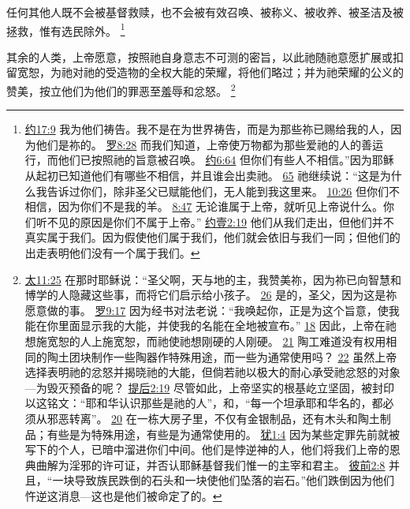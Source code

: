 \documentclass[12pt, a4paper, oneside]{ctexart}
\newcounter{parnum}[section]
\newcommand{\N}{%
   \noindent\refstepcounter{parnum}%
    \makebox[\parindent][l]{\textbf{\arabic{parnum}.}}}
\begin{document}
	任何其他人既不会被基督救赎，也不会被有效召唤、被称义、被收养、被圣洁及被拯救，惟有选民除外。
	\footnote {
		\href{https://biblehub.com/john/17-9.htm}{约17:9} 我为他们祷告。我不是在为世界祷告，而是为那些祢已赐给我的人，因为他们是祢的。
		\href{https://biblehub.com/romans/8-28.htm}{罗8:28} 而我们知道，上帝使万物都为那些爱祂的人的善运行，而他们已按照祂的旨意被召唤。
		\href{https://biblehub.com/john/6-64.htm}{约6:64} 但你们有些人不相信。”因为耶稣从起初已知道他们有哪些不相信，并且谁会出卖祂。
		\href{https://biblehub.com/john/6-65.htm}{65} 祂继续说：“这是为什么我告诉过你们，除非圣父已赋能他们，无人能到我这里来。
		\href{https://biblehub.com/john/10-26.htm}{10:26} 但你们不相信，因为你们不是我的羊。
		\href{https://biblehub.com/john/8-47.htm}{8:47} 无论谁属于上帝，就听见上帝说什么。你们听不见的原因是你们不属于上帝。”
		\href{https://biblehub.com/1_john/2-19.htm}{约壹2:19} 他们从我们走出，但他们并不真实属于我们。因为假使他们属于我们，他们就会依旧与我们一同；但他们的出走表明他们没有一个属于我们。
	}

\N 其余的人类，上帝愿意，按照祂自身意志不可测的密旨，以此祂随祂意愿扩展或扣留宽恕，为祂对祂的受造物的全权大能的荣耀，将他们略过；并为祂荣耀的公义的赞美，按立他们为他们的罪恶至羞辱和忿怒。
	\footnote {
		\href{https://biblehub.com/matthew/11-25.htm}{太11:25} 在那时耶稣说：“圣父啊，天与地的主，我赞美祢，因为祢已向智慧和博学的人隐藏这些事，而将它们启示给小孩子。
		\href{https://biblehub.com/matthew/11-26.htm}{26} 是的，圣父，因为这是祢愿意做的事。
		\href{https://biblehub.com/romans/9-17.htm}{罗9:17} 因为经书对法老说：“我唤起你，正是为这个旨意，使我能在你里面显示我的大能，并使我的名能在全地被宣布。”
		\href{https://biblehub.com/romans/9-18.htm}{18} 因此，上帝在祂想施宽恕的人上施宽恕，而祂使祂想刚硬的人刚硬。
		\href{https://biblehub.com/romans/9-21.htm}{21} 陶工难道没有权用相同的陶土团块制作一些陶器作特殊用途，而一些为通常使用吗？
		\href{https://biblehub.com/romans/9-22.htm}{22} 虽然上帝选择表明祂的忿怒并揭晓祂的大能，但倘若祂以极大的耐心承受祂忿怒的对象---为毁灭预备的呢？
		\href{https://biblehub.com/2_timothy/2-19.htm}{提后2:19} 尽管如此，上帝坚实的根基屹立坚固，被封印以这铭文：“耶和华认识那些是祂的人”，和，“每一个坦承耶和华名的，都必须从邪恶转离”。
		\href{https://biblehub.com/2_timothy/2-20.htm}{20} 在一栋大房子里，不仅有金银制品，还有木头和陶土制品；有些是为特殊用途，有些是为通常使用的。
		\href{https://biblehub.com/jude/1-4.htm}{犹1:4} 因为某些定罪先前就被写下的个人，已暗中溜进你们中间。他们是悖逆神的人，他们将我们上帝的恩典曲解为淫邪的许可证，并否认耶稣基督我们惟一的主宰和君主。
		\href{https://biblehub.com/1_peter/2-8.htm}{彼前2:8} 并且，“一块导致族民跌倒的石头和一块使他们坠落的岩石。”他们跌倒因为他们忤逆这消息---这也是他们被命定了的。
	}
\end{document}
